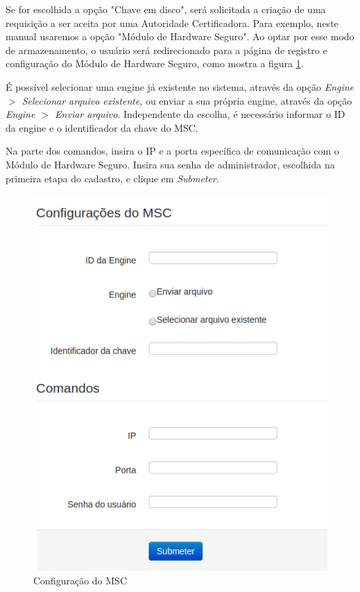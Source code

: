     Se for escolhida a opção "Chave em disco", será solicitada a criação de uma requisição a ser aceita por uma Autoridade Certificadora. Para exemplo, neste manual usaremos a opção "Módulo de Hardware Seguro". Ao optar por esse modo de armazenamento, o usuário será redirecionado para a página de registro e configuração do Módulo de Hardware Seguro, como mostra a figura \ref{fig:confighsm}.
    
    É possível selecionar uma engine já existente no sistema, através da opção \textit{Engine $>$ Selecionar arquivo existente}, ou enviar a sua própria engine, através da opção \textit{Engine $>$ Enviar arquivo}. Independente da escolha, é necessário informar o ID da engine e o identificador da chave do MSC.
    
    Na parte dos comandos, insira o IP e a porta específica de comunicação com o Módulo de Hardware Seguro. Insira sua senha de administrador, escolhida na primeira etapa do cadastro, e clique em \textit{Submeter}.
    
    \begin{figure}[ht]
     \centering
     \includegraphics[scale=0.5]{images/confighsm.png}
     \caption{Configuração do MSC}
     \label{fig:confighsm}
\end{figure}

